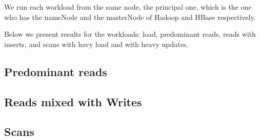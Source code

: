 We run each workload from the same node, the principal one, which is the one who has the nameNode and the masterNode of Hadoop and HBase respectively.

Below we present results for the workloads: load, predominant reads, reads with inserts, and scans with havy load and with heavy updates.

\subsection{Predominant reads}

\subsection{Reads mixed with Writes}

\subsection{Scans}